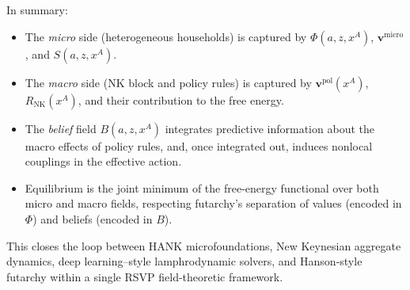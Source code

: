 \documentclass[12pt]{article}
\begin{document}
In summary:
\begin{itemize}
    \item The \emph{micro} side (heterogeneous households) is captured by
    $\Phi(a,z,x^A)$, $\mathbf{v}^{\text{micro}}$, and $S(a,z,x^A)$.
    \item The \emph{macro} side (NK block and policy rules) is captured
    by $\mathbf{v}^{\text{pol}}(x^A)$, $R_{\text{NK}}(x^A)$, and their
    contribution to the free energy.
    \item The \emph{belief} field $B(a,z,x^A)$ integrates predictive
    information about the macro effects of policy rules, and, once
    integrated out, induces nonlocal couplings in the effective action.
    \item Equilibrium is the joint minimum of the free-energy functional
    over both micro and macro fields, respecting futarchy’s separation
    of values (encoded in $\Phi$) and beliefs (encoded in $B$).
\end{itemize}

This closes the loop between HANK microfoundations, New Keynesian
aggregate dynamics, deep learning–style lamphrodynamic solvers, and
Hanson-style futarchy within a single RSVP field-theoretic framework.
\end{document}
